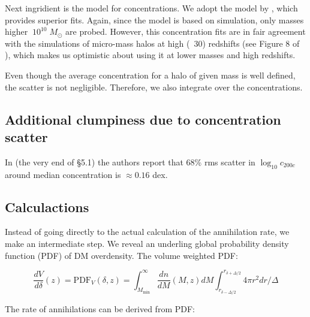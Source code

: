 Next ingridient is the model for concentrations. We adopt the model by \cite{2014arXiv1407.4730D}, which provides superior fits. Again, since the model is based on simulation, only masses higher $~10^{10}\;M_\odot$ are probed. However, this concentration fits are in fair agreement with the simulations of micro-mass halos at high (~30) redshifts (see Figure 8 of \cite{2014arXiv1407.4730D}), which makes us optimistic about using it at lower masses and high redshifts.

Even though the average concentration for a halo of given mass is well defined, the scatter is not negligible. Therefore, we also integrate over the concentrations.




\subsection{Additional clumpiness due to concentration scatter}

In \cite{2014arXiv1407.4730D} (the very end of \S5.1) the authors report that 68\% rms scatter in $\log_{10}c_{200c}$ around median concentration is $\approx 0.16$ dex. 


\subsection{Calculactions}
Instead of going directly to the actual calculation of the annihilation rate, we make an intermediate step. We reveal an underling global probability density function (PDF) of DM overdensity. The volume weighted PDF:

\begin{equation}
\dfrac{dV}{d\delta}(z)=\mathrm{PDF}_V (\delta, z) = \int_{M_\mathrm{min}}^\infty \dfrac{dn}{dM}(M,z) dM \int_{r_{\delta-\Delta/2}}^{r_{\delta+\Delta/2}} 4\pi r^2 dr / \Delta
\end{equation}

The rate of annihilations can be derived from PDF: